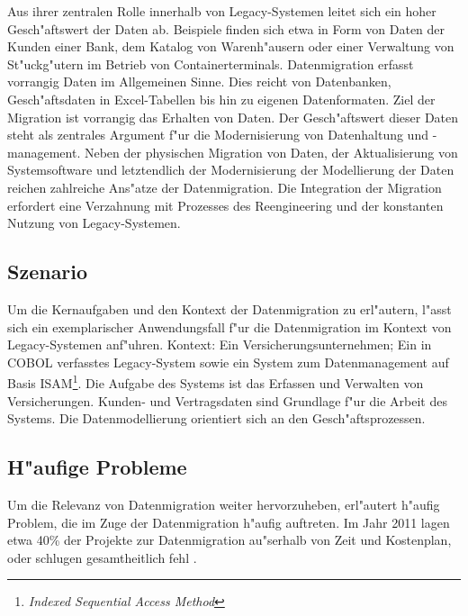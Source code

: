 Aus ihrer zentralen Rolle innerhalb von Legacy-Systemen leitet sich ein hoher Gesch"aftswert der Daten ab. Beispiele finden sich etwa in Form von Daten der Kunden einer Bank, dem Katalog von Warenh"ausern oder einer Verwaltung von St"uckg"utern im Betrieb von Containerterminals. 
\lb
Datenmigration erfasst vorrangig Daten im Allgemeinen Sinne. Dies reicht von Datenbanken, Gesch"aftsdaten in Excel-Tabellen bis hin zu eigenen Datenformaten. Ziel der Migration ist vorrangig das Erhalten von Daten. Der Gesch"aftswert dieser Daten steht als zentrales Argument f"ur die Modernisierung von Datenhaltung und -management. Neben der physischen Migration von Daten, der Aktualisierung von Systemsoftware und letztendlich der Modernisierung der Modellierung der Daten reichen zahlreiche Ans"atze der Datenmigration. Die Integration der Migration erfordert eine Verzahnung mit Prozesses des Reengineering und der konstanten Nutzung von Legacy-Systemen.

\subsection{Szenario}

Um die Kernaufgaben und den Kontext der Datenmigration zu erl"autern, l"asst sich ein exemplarischer Anwendungsfall f"ur die Datenmigration im Kontext von Legacy-Systemen anf"uhren.
\lb
Kontext:
Ein Versicherungsunternehmen; Ein in COBOL verfasstes Legacy-System sowie ein System zum Datenmanagement auf Basis ISAM\footnote{\textit{Indexed Sequential Access Method}}. Die Aufgabe des Systems ist das Erfassen und Verwalten von Versicherungen. Kunden- und Vertragsdaten sind Grundlage f"ur die Arbeit des Systems. Die Datenmodellierung orientiert sich an den Gesch"aftsprozessen. 

\subsection{H"aufige Probleme}

Um die Relevanz von Datenmigration weiter hervorzuheben, erl"autert \citep{morris-2012} h"aufig Problem, die im Zuge der Datenmigration h"aufig auftreten. Im Jahr 2011 lagen etwa 40\% der Projekte zur Datenmigration au"serhalb von Zeit und Kostenplan, oder schlugen gesamtheitlich fehl \citep{howard-2011}.

